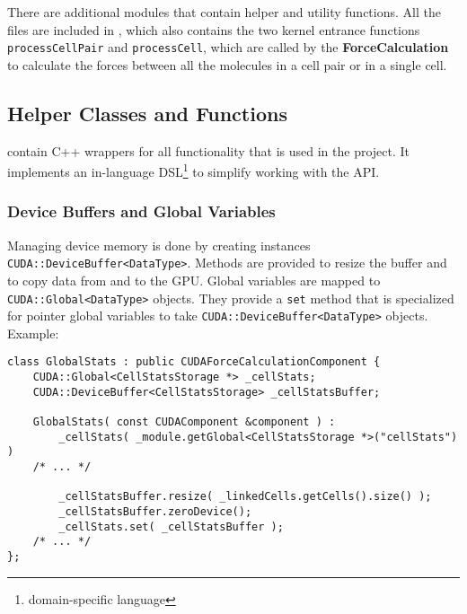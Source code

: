 
There are additional \cuda{} modules that contain helper and utility functions.
All the  files are included in , which also contains the two kernel entrance functions \lstinline!processCellPair! and \lstinline!processCell!, which are called by the \textbf{ForceCalculation} to calculate the forces between all the molecules in a cell pair or in a single cell.

\subsection{\cuda{} Helper Classes and Functions}
 contain C++ wrappers for all \cuda{} functionality that is used in the project.
It implements an in-language DSL\footnote{domain-specific language} to simplify working with the \cuda{} API.


\subsubsection{Device Buffers and Global Variables}
Managing device memory is done by creating instances \lstinline!CUDA::DeviceBuffer<DataType>!. Methods are provided to resize the buffer and to copy data from and to the GPU.
Global variables are mapped to \lstinline!CUDA::Global<DataType>! objects. They provide a \lstinline!set! method that is specialized for pointer global variables to take \lstinline!CUDA::DeviceBuffer<DataType>! objects.
Example:
\begin{lstlisting}[label=cudamemoryhelpers,caption=CUDA helper classes for Device Memory and Globals]
class GlobalStats : public CUDAForceCalculationComponent {
	CUDA::Global<CellStatsStorage *> _cellStats;
	CUDA::DeviceBuffer<CellStatsStorage> _cellStatsBuffer;
	
	GlobalStats( const CUDAComponent &component ) :
		_cellStats( _module.getGlobal<CellStatsStorage *>("cellStats") )
	/* ... */
	
		_cellStatsBuffer.resize( _linkedCells.getCells().size() );
		_cellStatsBuffer.zeroDevice();
		_cellStats.set( _cellStatsBuffer );		
	/* ... */		
};	
\end{lstlisting}

